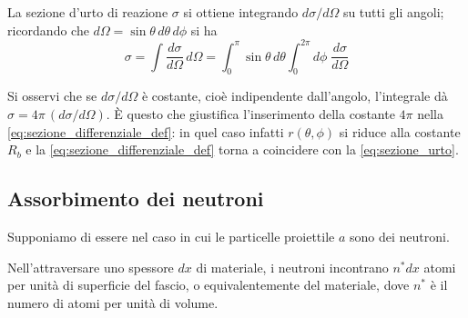 La sezione d'urto di reazione $\sigma$ si ottiene integrando $d\sigma/d\Omega$ su tutti gli angoli; ricordando che $d\Omega = \sin\theta \, d\theta \, d\phi$ si ha
%
\begin{equation}
    \sigma = \int \frac{d\sigma}{d\Omega} \, d\Omega = \int_0^{\pi} \sin\theta \, d\theta \int_0^{2\pi} d\phi \; \frac{d\sigma}{d\Omega}
    \label{eq:sigma_integrata}
\end{equation}

Si osservi che se $d\sigma/d\Omega$ è costante, cioè indipendente dall'angolo, l'integrale dà $\sigma = 4\pi \, (d\sigma/d\Omega)$. È questo che giustifica l'inserimento della costante $4\pi$ nella \eqref{eq:sezione_differenziale_def}: in quel caso infatti $r(\theta,\phi)$ si riduce alla costante $R_b$ e la \eqref{eq:sezione_differenziale_def} torna a coincidere con la \eqref{eq:sezione_urto}.

\subsection{Assorbimento dei neutroni}

Supponiamo di essere nel caso in cui le particelle proiettile $a$ sono dei neutroni.

Nell'attraversare uno spessore $dx$ di materiale, i neutroni incontrano $n^* dx$ atomi per unità di superficie del fascio, o equivalentemente del materiale, dove $n^*$ è il numero di atomi per unità di volume.

